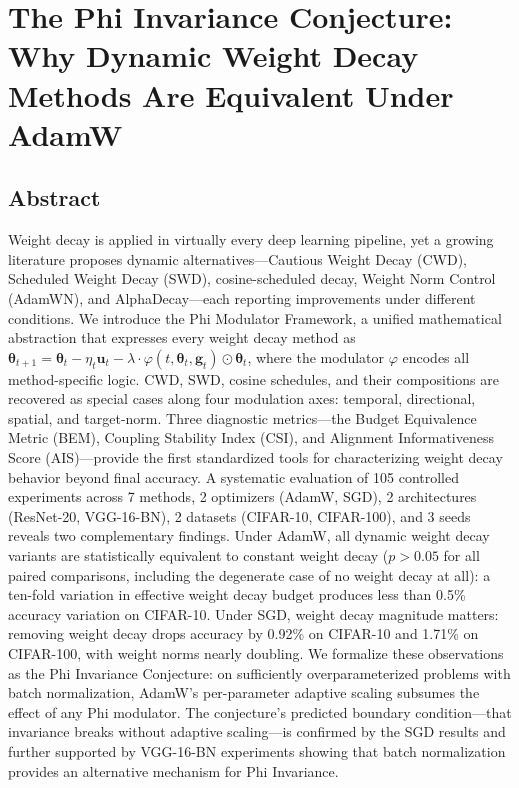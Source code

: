 \documentclass[
]{article}
\author{}
\date{}
\begin{document}
\hypertarget{the-phi-invariance-conjecture-why-dynamic-weight-decay-methods-are-equivalent-under-adamw}{%
\section{The Phi Invariance Conjecture: Why Dynamic Weight Decay Methods
Are Equivalent Under
AdamW}\label{the-phi-invariance-conjecture-why-dynamic-weight-decay-methods-are-equivalent-under-adamw}}

\hypertarget{abstract}{%
\subsection{Abstract}\label{abstract}}

Weight decay is applied in virtually every deep learning pipeline, yet a
growing literature proposes dynamic alternatives---Cautious Weight Decay
(CWD), Scheduled Weight Decay (SWD), cosine-scheduled decay, Weight Norm
Control (AdamWN), and AlphaDecay---each reporting improvements under
different conditions. We introduce the Phi Modulator Framework, a
unified mathematical abstraction that expresses every weight decay
method as
\(\boldsymbol{\theta}_{t+1} = \boldsymbol{\theta}_t - \eta_t \mathbf{u}_t - \lambda \cdot \varphi(t, \boldsymbol{\theta}_t, \mathbf{g}_t) \odot \boldsymbol{\theta}_t\),
where the modulator \(\varphi\) encodes all method-specific logic. CWD,
SWD, cosine schedules, and their compositions are recovered as special
cases along four modulation axes: temporal, directional, spatial, and
target-norm. Three diagnostic metrics---the Budget Equivalence Metric
(BEM), Coupling Stability Index (CSI), and Alignment Informativeness
Score (AIS)---provide the first standardized tools for characterizing
weight decay behavior beyond final accuracy. A systematic evaluation of
105 controlled experiments across 7 methods, 2 optimizers (AdamW, SGD),
2 architectures (ResNet-20, VGG-16-BN), 2 datasets (CIFAR-10,
CIFAR-100), and 3 seeds reveals two complementary findings. Under AdamW,
all dynamic weight decay variants are statistically equivalent to
constant weight decay (\(p > 0.05\) for all paired comparisons,
including the degenerate case of no weight decay at all): a ten-fold
variation in effective weight decay budget produces less than 0.5\%
accuracy variation on CIFAR-10. Under SGD, weight decay magnitude
matters: removing weight decay drops accuracy by 0.92\% on CIFAR-10 and
1.71\% on CIFAR-100, with weight norms nearly doubling. We formalize
these observations as the Phi Invariance Conjecture: on sufficiently
overparameterized problems with batch normalization, AdamW's
per-parameter adaptive scaling subsumes the effect of any Phi modulator.
The conjecture's predicted boundary condition---that invariance breaks
without adaptive scaling---is confirmed by the SGD results and further
supported by VGG-16-BN experiments showing that batch normalization
provides an alternative mechanism for Phi Invariance.
\end{document}

